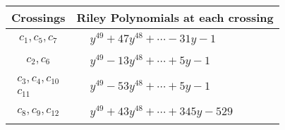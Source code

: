 \documentclass[1p]{elsarticle_modified}
\theoremstyle{definition}
\begin{document}
\begin{tabular}{m{50pt}|m{274pt}}
Crossings & \hspace{64pt}Riley Polynomials at each crossing \\
\hline $$\begin{aligned}c_{1},c_{5},c_{7}\end{aligned}$$&$\begin{aligned}
&y^{49}+47 y^{48}+\cdots-31 y-1
\end{aligned}$\\
\hline $$\begin{aligned}c_{2},c_{6}\end{aligned}$$&$\begin{aligned}
&y^{49}-13 y^{48}+\cdots+5 y-1
\end{aligned}$\\
\hline $$\begin{aligned}c_{3},c_{4},c_{10}\\c_{11}\end{aligned}$$&$\begin{aligned}
&y^{49}-53 y^{48}+\cdots+5 y-1
\end{aligned}$\\
\hline $$\begin{aligned}c_{8},c_{9},c_{12}\end{aligned}$$&$\begin{aligned}
&y^{49}+43 y^{48}+\cdots+345 y-529
\end{aligned}$\\
\hline
\end{tabular}
\vskip 2pc
\end{document}
